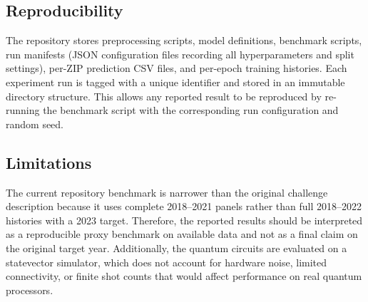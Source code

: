 \documentclass[11pt]{article}
\begin{document}
\subsection*{Reproducibility}

The repository stores preprocessing scripts, model definitions, benchmark scripts, run manifests (JSON configuration files recording all hyperparameters and split settings), per-ZIP prediction CSV files, and per-epoch training histories. Each experiment run is tagged with a unique identifier and stored in an immutable directory structure. This allows any reported result to be reproduced by re-running the benchmark script with the corresponding run configuration and random seed.

\subsection*{Limitations}

The current repository benchmark is narrower than the original challenge description because it uses complete 2018--2021 panels rather than full 2018--2022 histories with a 2023 target. Therefore, the reported results should be interpreted as a reproducible proxy benchmark on available data and not as a final claim on the original target year. Additionally, the quantum circuits are evaluated on a statevector simulator, which does not account for hardware noise, limited connectivity, or finite shot counts that would affect performance on real quantum processors.
\end{document}
